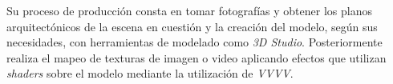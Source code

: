 Su proceso de producción consta en tomar fotografías y obtener los planos arquitectónicos de la escena en cuestión y la creación del modelo, según sus necesidades, con herramientas de modelado como \emph{3D Studio}. Posteriormente realiza el mapeo de texturas de imagen o video aplicando efectos que utilizan \emph{shaders} sobre el modelo mediante la utilización de \emph{VVVV}.